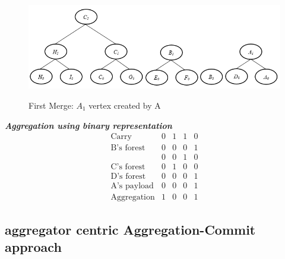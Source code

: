 	\begin{figure}[hp]
		\centering
		\includegraphics[scale = 0.7]{images/commitment-tree-example-2.png}\\
		\caption{First Merge: $A_{1}$ vertex created by A}
	\end{figure}


	\textit{\textbf{ Aggregation using binary representation}}
	\[ 
		\begin{array}{lcccc}
			\mbox{Carry} & 0 & 1 & 1 & 0\\
			\hline
			\mbox{B's forest} & 0 & 0 & 0 & 1 \\
			\mbox{ } & 0 & 0 & 1 & 0 \\
			\hline
			\mbox{C's forest} & 0 & 1 & 0 & 0 \\
			\hline
			\mbox{D's forest} & 0 & 0 & 0 & 1 \\
			\hline
			\mbox{A's payload} & 0 & 0 & 0 & 1 \\
			\hline
			\mbox{Aggregation} & 1 & 0 & 0 & 1 
		\end{array}
	\] 

	\subsection{aggregator centric Aggregation-Commit approach}


